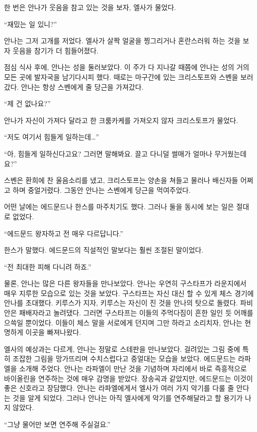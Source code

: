 한 번은 안나가 웃음을 참고 있는 것을 보자, 엘사가 물었다.

``재밌는 일 있니?''

안나는 그저 고개를 저었다. 엘사가 살짝 얼굴을 찡그리거나 혼란스러워 하는 것을 보자 웃음을 참기가 더 힘들어졌다.

점심 식사 후에, 안나는 성을 둘러보았다. 이 주가 다 지나갈 때쯤에 안나는 성의 거의 모든 곳에 발자국을 남기다시피 했다. 때로는 마구간에 있는 크리스토프와 스벤을 보러 갔다. 안나는 항상 스벤에게 줄 당근을 가져갔다.

``제 건 없나요?''

안나가 자신이 가져다 달라고 한 크룸카케를 가져오지 않자 크리스토프가 물었다.

``저도 여기서 힘들게 일하는데\ldots''

``아, 힘들게 일하신다고요? 그러면 말해봐요. 끌고 다니덜 썰매가 얼마나 무거웠는데요?''

스벤은 환희에 찬 울음소리를 냈고, 크리스토프는 양손을 쳐들고 물러나 배신자들 어쩌고 하며 중얼거렸다. 그동안 안나는 스벤에게 당근을 먹여주었다.

어떤 날에는 에드문드나 한스를 마주치기도 했다. 그러나 둘을 동시에 보는 일은 절대로 없었다.

``에드문드 왕자하고 전 매우 다르답니다.''

한스가 말했다. 에드문드의 직설적인 말보다는 훨씬 조절된 말이었다.

``전 최대한 피해 다니려 하죠.''

물론, 안나는 많은 다른 왕자들을 만나보았다. 안나는 우연히 구스타프가 라운지에서 매우 지루한 모습으로 있는 것을 보았다. 구스타프는 자신 대신 할 수 있게 체스 경기에 안나를 초대했다. 키루스가 지자, 키루스는 자신이 진 것을 안나의 탓으로 돌렸다. 파비안은 패배자라고 놀려댔다. 그러면 구스타프는 이들의 주먹다짐이 흔한 일인 듯 어깨를 으쓱일 뿐이었다. 이들이 체스 말을 서로에게 던지며 그만 하라고 소리치자, 안나는 현명하게 이곳을 빠져나왔다.

엘사의 예상과는 다르게, 안나는 정말로 스테판을 만나보았다. 걸려있는 그림 중에 특히 조잡한 그림을 망가뜨리며 수치스럽다고 중얼대는 모습을 보았다. 에드문드는 라파엘을 소개해 주었다. 안나는 라파엘이 만난 것을 기념하며 자리에서 바로 즉흥적으로 바이올린을 연주하는 것에 매우 감명을 받았다. 장송곡과 같았지만, 에드문드는 이것이 좋은 신호라고 장담했다. 안나는 라파엘에게서 엘사가 여러 가지 악기를 다룰 줄 안다는 것을 알게 되었다. 그러나 안나는 아직 엘사에게 악기를 연주해달라고 할 용기가 나지 않았다.

``그냥 물어만 보면 연주해 주실걸요.''

